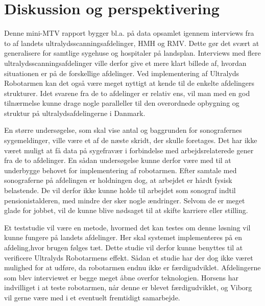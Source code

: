\chapter{Diskussion og perspektivering}

Denne mini-MTV rapport bygger bl.a. på data opsamlet igennem interviews fra to af landets ultralydsscanningsafdelinger, HMH og RMV. Dette gør det svært at generalisere for samtlige sygehuse og hospitaler på landsplan. Interviews med flere ultralydsscanningsafdelinger ville derfor give et mere klart billede af, hvordan situationen er på de forskellige afdelinger. Ved implementering af Ultralyds Robotarmen kan det også være meget nyttigt at kende til de enkelte afdelingers strukturer. 
Idet svarene fra de to afdelinger er relativ ens, vil man med en god tilnærmelse kunne drage nogle paralleller til den overordnede opbygning og struktur på ultralydsafdelingerne i Danmark.

En større undersøgelse, som skal vise antal og baggrunden for sonografernes sygemeldinger, ville være et af de næste skridt, der skulle foretages. Det har ikke været muligt at få data på sygefravær i forbindelse med arbejdsrelaterede gener fra de to afdelinger. En sådan undersøgelse kunne derfor være med til at underbygge behovet for implementering af robotarmen.
Efter samtale med sonograferne på afdelingen er holdningen dog, at arbejdet er hårdt fysisk belastende.  De vil derfor ikke kunne holde til arbejdet som sonograf indtil pensionistalderen, med mindre der sker nogle ændringer. Selvom de er meget glade for jobbet, vil de kunne blive nødsaget til at skifte karriere eller stilling. 


Et teststudie vil være en metode, hvormed det kan testes om denne løsning vil kunne fungere på landets afdelinger. Her skal systemet implementeres på en afdeling,hvor brugen følges tæt. Dette studie vil derfor kunne benyttes til at verificere Ultralyds Robotarmens effekt. Sådan et studie har der dog ikke været mulighed for at udføre, da robotarmen endnu ikke er færdigudviklet. 
Afdelingerne som blev interviewet er begge meget åbne overfor teknologien. Horsens har indvilliget i at teste robotarmen, når denne er blevet færdigudviklet, og Viborg vil gerne være med i et eventuelt fremtidigt samarbejde. 

